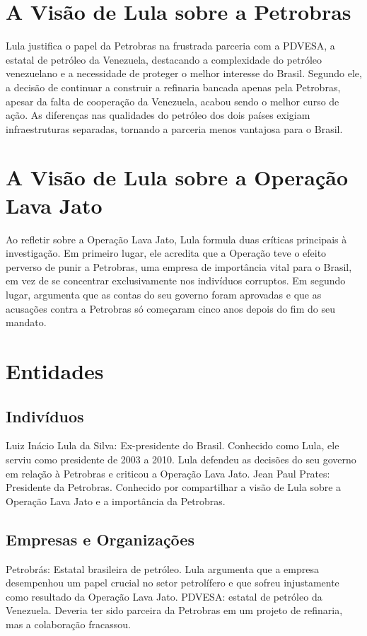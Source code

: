\documentclass[
   article,       
   12pt,          
   oneside,       
   a4paper,       
   english,       
   brazil,        
   sumario=tradicional
   ]{abntex2}
\begin{document}
\section{A Visão de Lula sobre a Petrobras}
Lula justifica o papel da Petrobras na frustrada parceria com a PDVESA, a estatal de petróleo da Venezuela, destacando a complexidade do petróleo venezuelano e a necessidade de proteger o melhor interesse do Brasil. Segundo ele, a decisão de continuar a construir a refinaria bancada apenas pela Petrobras, apesar da falta de cooperação da Venezuela, acabou sendo o melhor curso de ação. As diferenças nas qualidades do petróleo dos dois países exigiam infraestruturas separadas, tornando a parceria menos vantajosa para o Brasil.
\section{A Visão de Lula sobre a Operação Lava Jato}
Ao refletir sobre a Operação Lava Jato, Lula formula duas críticas principais à investigação. Em primeiro lugar, ele acredita que a Operação teve o efeito perverso de punir a Petrobras, uma empresa de importância vital para o Brasil, em vez de se concentrar exclusivamente nos indivíduos corruptos. Em segundo lugar, argumenta que as contas do seu governo foram aprovadas e que as acusações contra a Petrobras só começaram cinco anos depois do fim do seu mandato.
\section{Entidades}
\subsection{Indivíduos}
Luiz Inácio Lula da Silva: Ex-presidente do Brasil. Conhecido como Lula, ele serviu como presidente de 2003 a 2010. Lula defendeu as decisões do seu governo em relação à Petrobras e criticou a Operação Lava Jato.
Jean Paul Prates: Presidente da Petrobras. Conhecido por compartilhar a visão de Lula sobre a Operação Lava Jato e a importância da Petrobras.
\subsection{Empresas e Organizações}
Petrobrás: Estatal brasileira de petróleo. Lula argumenta que a empresa desempenhou um papel crucial no setor petrolífero e que sofreu injustamente como resultado da Operação Lava Jato.
PDVESA: estatal de petróleo da Venezuela. Deveria ter sido parceira da Petrobras em um projeto de refinaria, mas a colaboração fracassou.
\end{document}
